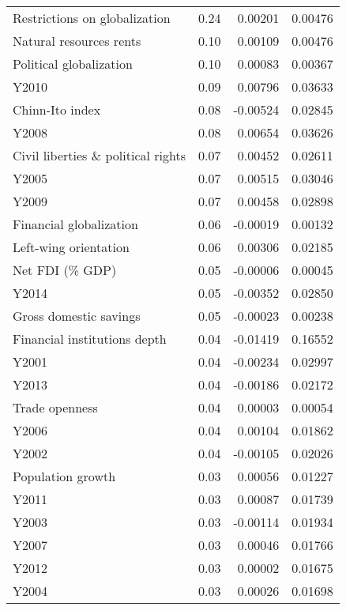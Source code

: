 \documentclass[a4paper,11pt]{article}
\begin{document}
\begin{table}[!ht]
\begin{tabular}{lrrr}
  Restrictions on globalization & 0.24 & 0.00201 & 0.00476 \\ 
  Natural resources rents & 0.10 & 0.00109 & 0.00476 \\
  Political globalization & 0.10 & 0.00083 & 0.00367 \\
  Y2010 & 0.09 & 0.00796 & 0.03633 \\
  Chinn-Ito index & 0.08 & -0.00524 & 0.02845 \\ 
  Y2008 & 0.08 & 0.00654 & 0.03626 \\
  Civil liberties \& political rights & 0.07 & 0.00452 & 0.02611 \\ 
  Y2005 & 0.07 & 0.00515 & 0.03046 \\
  Y2009 & 0.07 & 0.00458 & 0.02898 \\
  Financial globalization & 0.06 & -0.00019 & 0.00132 \\
  Left-wing orientation & 0.06 & 0.00306 & 0.02185 \\ 
  Net FDI (\% GDP) & 0.05 & -0.00006 & 0.00045 \\
  Y2014 & 0.05 & -0.00352 & 0.02850 \\ 
  Gross domestic savings & 0.05 & -0.00023 & 0.00238 \\
  Financial institutions depth & 0.04 & -0.01419 & 0.16552 \\
  Y2001 & 0.04 & -0.00234 & 0.02997 \\
  Y2013 & 0.04 & -0.00186 & 0.02172 \\
  Trade openness & 0.04 & 0.00003 & 0.00054 \\ 
  Y2006 & 0.04 & 0.00104 & 0.01862 \\ 
  Y2002 & 0.04 & -0.00105 & 0.02026 \\
  Population growth & 0.03 & 0.00056 & 0.01227 \\
  Y2011 & 0.03 & 0.00087 & 0.01739 \\ 
  Y2003 & 0.03 & -0.00114 & 0.01934 \\
  Y2007 & 0.03 & 0.00046 & 0.01766 \\ 
  Y2012 & 0.03 & 0.00002 & 0.01675 \\
  Y2004 & 0.03 & 0.00026 & 0.01698 \\
\end{tabular}
\end{table}
%
\clearpage
%
\end{document}
